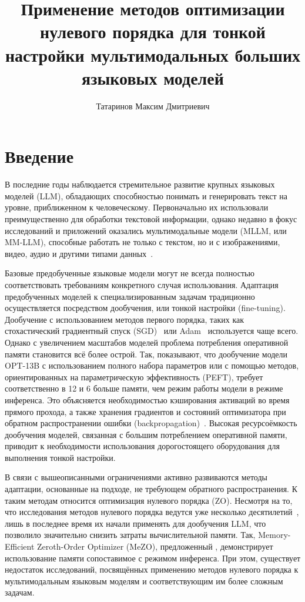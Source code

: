\documentclass[LI,KR]{HSEUniversity}
\title{Применение методов оптимизации нулевого порядка для тонкой настройки мультимодальных больших языковых моделей}
\author{Татаринов Максим Дмитриевич}
\begin{document}
\maketitle

\chapter*{Введение}

В последние годы наблюдается стремительное развитие крупных языковых моделей (LLM), обладающих способностью понимать и генерировать текст на уровне,
приближенном к человеческому.
Первоначально их использовали преимущественно для обработки текстовой информации,
однако недавно в фокус исследований и приложений оказались мультимодальные модели (MLLM, или MM-LLM),
способные работать не только с текстом, но и с изображениями, видео, аудио и другими типами данных~\cite{llava, llavaonevision}.

Базовые предобученные языковые модели могут не всегда полностью соответствовать требованиям конкретного случая использования.
Адаптация предобученных моделей к специализированным задачам традиционно осуществляется посредством дообучения, или тонкой настройки (fine-tuning).
Дообучение с использованием методов первого порядка, таких как стохастический градиентный спуск (SGD)~\cite{sgd} или Adam~\cite{adam} используется чаще всего.
Однако с увеличением масштабов моделей проблема потребления оперативной памяти становится всё более острой.
Так, \cite{mezo} показывают, что дообучение модели OPT-13B с использованием полного набора параметров или с помощью методов, ориентированных на параметрическую эффективность (PEFT), требует соответственно в 12 и 6 больше памяти, чем режим работы модели в режиме инференса.
Это объясняется необходимостью кэширования активаций во время прямого прохода,
а также хранения градиентов и состояний оптимизатора при обратном распространении ошибки (backpropagation)~\cite{backpropagation}.
Высокая ресурсоёмкость дообучения моделей, связанная с большим потреблением оперативной памяти,
приводит к необходимости использования дорогостоящего оборудования для выполнения тонкой настройки.

В связи с вышеописанными ограничениями активно развиваются методы адаптации, основанные на подходе, не требующем обратного распространения.
К таким методам относится оптимизация нулевого порядка (ZO).
Несмотря на то, что исследования методов нулевого порядка ведутся уже несколько десятилетий~\cite{spsa,rsg}, лишь в последнее время их начали применять для дообучения LLM, что позволило значительно снизить затраты вычислительной памяти.
Так, Memory-Efficient Zeroth-Order Optimizer (MeZO), предложенный \cite{mezo}, демонстрирует использование памяти сопоставимое с режимом инференса.
При этом, существует недостаток исследований, посвящённых применению методов нулевого порядка к мультимодальным языковым моделям и соответствующим им более сложным задачам.
\end{document}
